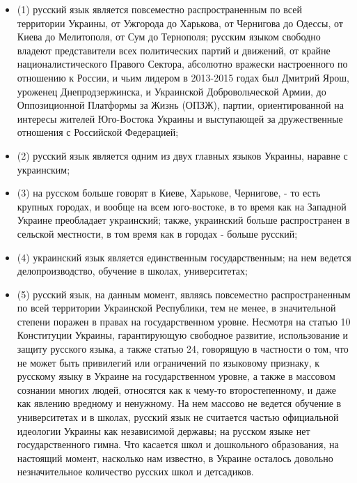 \begin{itemize} %
\item (1) русский язык является повсеместно распространенным по всей территории
Украины, от Ужгорода до Харькова, от Чернигова до Одессы, от Киева до
Мелитополя, от Сум до Тернополя; русским языком свободно владеют представители
всех политических партий и движений, от крайне националистического Правого
Сектора, абсолютно вражески настроенного по отношению к России, и чьим лидером
в 2013-2015 годах был Дмитрий Ярош, уроженец Днепродзержинска, и Украинской
Добровольческой Армии, до Оппозиционной Платформы за Жизнь (ОПЗЖ), партии,
ориентированной на интересы жителей Юго-Востока Украины и выступающей за
дружественные отношения с Российской Федерацией;

\item (2) русский язык является одним из двух главных языков Украины, наравне с украинским;

\item (3) на русском больше говорят в Киеве, Харькове, Чернигове, - то есть
крупных городах, и вообще на всем юго-востоке, в то время как на Западной
Украине преобладает украинский; также, украинский больше распространен в
сельской местности, в том время как в городах - больше русский;

\item (4) украинский язык является единственным государственным; на нем ведется
делопроизводство, обучение в школах, университетах; 

\item (5) русский язык, на данным момент, являясь повсеместно распространенным
по всей территории Украинской Республики, тем не менее, в значительной степени
поражен в правах на государственном уровне. Несмотря на статью 10 Конституции
Украины, гарантирующую свободное развитие, использование и защиту русского
языка, а также статью 24, говорящую в частности о том, что не может быть
привилегий или ограничений по языковому признаку, к русскому языку в Украине на
государственном уровне, а также в массовом сознании многих людей, относятся как
к чему-то второстепенному, и даже как явлению вредному и ненужному.  На нем
массово не ведется обучение в университетах и в школах, русский язык не
считается частью официальной идеологии Украины как независимой державы; на
русском языке нет государственного гимна.  Что касается школ и дошкольного
образования, на настоящий момент, насколько нам известно, в Украине осталось
довольно незначительное количество русских школ и детсадиков. 


\end{itemize}
